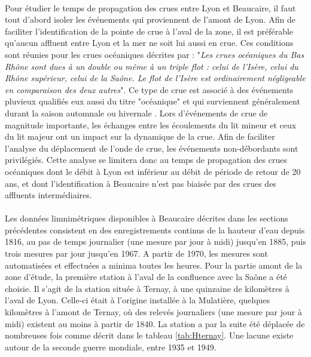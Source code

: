 	\paragraph{} Pour étudier le temps de propagation des crues entre Lyon et Beaucaire, il faut tout d'abord isoler les événements qui proviennent de l'amont de Lyon. Afin de faciliter l'identification de la pointe de crue à l'aval de la zone, il est préférable qu'aucun affluent entre Lyon et la mer ne soit lui aussi en crue. Ces conditions sont réunies pour les crues océaniques décrites par \citet{parde_regime_1919} : "\textit{Les crues océaniques du Bas Rhône sont dues à un double ou même à un triple flot : celui de l'Isère, celui du Rhône supérieur, celui de la Saône. Le flot de l'Isère est ordinairement négligeable en comparaison des deux autres}". Ce type de crue est associé à des événements pluvieux qualifiés eux aussi du titre "océanique" et qui surviennent généralement durant la saison automnale ou hivernale \citep{parde_regime_1925}. Lors d'événements de crue de magnitude importante, les échanges entre les écoulements du lit mineur et ceux du lit majeur ont un impact sur la dynamique de la crue. Afin de faciliter l'analyse du déplacement de l'onde de crue, les événements non-débordants sont privilégiés. Cette analyse se limitera donc au temps de propagation des crues océaniques dont le débit à Lyon est inférieur au débit de période de retour de 20 ans, et dont l'identification à Beaucaire n'est pas biaisée par des crues des affluents intermédiaires. 
	
	\paragraph{} Les données limnimétriques disponibles à Beaucaire décrites dans les sections précédentes consistent en des enregistrements continus de la hauteur d'eau depuis 1816, au pas de temps journalier (une mesure par jour à midi) jusqu'en 1885, puis trois mesures par jour jusqu'en 1967. A partir de 1970, les mesures sont automatisées et effectuées a minima toutes les heures. Pour la partie amont de la zone d'étude, la première station à l'aval de la confluence avec la Saône a été choisie. Il s'agit de la station située à Ternay, à une quinzaine de kilomètres à l'aval de Lyon. Celle-ci était à l'origine installée à la Mulatière, quelques kilomètres à l'amont de Ternay, où des relevés journaliers (une mesure par jour à midi) existent au moins à partir de 1840. La station a par la suite été déplacée de nombreuses fois comme décrit dans le tableau \ref{tab:Hternay}. Une lacune existe autour de la seconde guerre mondiale, entre 1935 et 1949. 
	
